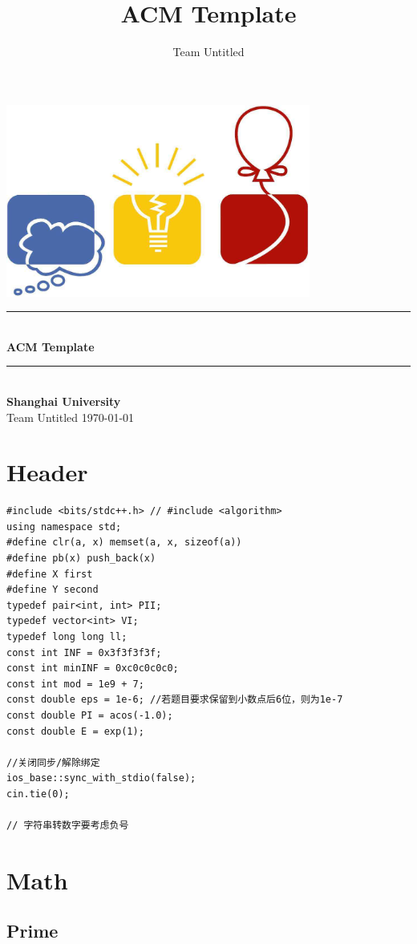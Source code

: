 \documentclass[twoside]{article}
\title{ACM Template}
\author{Team Untitled}
\newcommand{\HRule}{\rule{\linewidth}{0.5mm}}
\begin{document}
\small
\begin{titlepage}
\begin{center}
\vspace*{0.5cm}\includegraphics[width=0.75\textwidth]{logo.jpg} \\ [2cm]
\HRule \\ [1cm]
\textbf{\Huge{ACM Template}} \\ [0.5cm]
\HRule \\ [4cm]
\textbf{\Huge{Shanghai University}} \\ [1cm]
\LARGE{Team Untitled}
\vfill
\Large{\today}
\end{center}
\clearpage
\end{titlepage}
\tableofcontents\clearpage
\pagestyle{fancy}
\lfoot{}
\cfoot{\thepage}\rfoot{}
\setcounter{section}{-1}
\setcounter{page}{1}
\clearpage\section{Header}
\begin{lstlisting}
#include <bits/stdc++.h> // #include <algorithm>
using namespace std;
#define clr(a, x) memset(a, x, sizeof(a))
#define pb(x) push_back(x)
#define X first
#define Y second
typedef pair<int, int> PII;
typedef vector<int> VI;
typedef long long ll;
const int INF = 0x3f3f3f3f;
const int minINF = 0xc0c0c0c0;
const int mod = 1e9 + 7;
const double eps = 1e-6; //若题目要求保留到小数点后6位，则为1e-7
const double PI = acos(-1.0);
const double E = exp(1);

//关闭同步/解除绑定
ios_base::sync_with_stdio(false);
cin.tie(0);

// 字符串转数字要考虑负号
\end{lstlisting}
\clearpage\section{Math}
\subsection{Prime}
\end{document}
